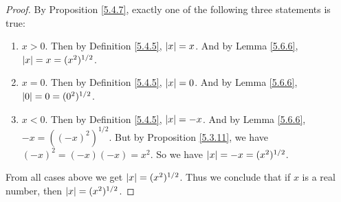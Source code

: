 \begin{proof}
    By Proposition \ref{5.4.7}, exactly one of the following three statements is true:
    \begin{enumerate}
        \item \(x > 0\).
              Then by Definition \ref{5.4.5}, \(\abs*{x} = x\).
              And by Lemma \ref{5.6.6}, \(\abs*{x} = x = (x^2)^{1 / 2}\).
        \item \(x = 0\).
              Then by Definition \ref{5.4.5}, \(\abs*{x} = 0\).
              And by Lemma \ref{5.6.6}, \(\abs*{0} = 0 = (0^2)^{1 / 2}\).
        \item \(x < 0\).
              Then by Definition \ref{5.4.5}, \(\abs*{x} = -x\).
              And by Lemma \ref{5.6.6}, \(-x = ((-x)^2)^{1 / 2}\).
              But by Proposition \ref{5.3.11}, we have \((-x)^2 = (-x)(-x) = x^2\).
              So we have \(\abs*{x} = -x = (x^2)^{1 / 2}\).
    \end{enumerate}
    From all cases above we get \(\abs*{x} = (x^2)^{1 / 2}\).
    Thus we conclude that if \(x\) is a real number, then \(\abs*{x} = (x^2)^{1 / 2}\).
\end{proof}